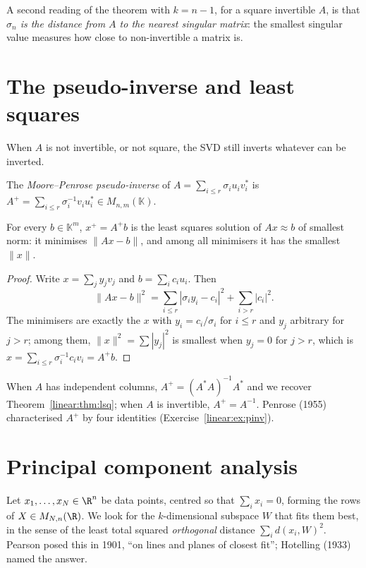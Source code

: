 A second reading of the theorem with $k=n-1$, for a square invertible $A$, is that \emph{$\sigma_n$ is the distance from $A$
to the nearest singular matrix}: the smallest singular value measures how close to non-invertible a matrix is.

\section{The pseudo-inverse and least squares}

When $A$ is not invertible, or not square, the SVD still inverts whatever can be inverted.

\begin{definition}\label{linear:def:pinv}
The \emph{Moore--Penrose pseudo-inverse} of $A=\sum_{i\le r}\sigma_iu_iv_i^*$ is $A^+=\sum_{i\le r}\sigma_i^{-1}v_iu_i^*\in
M_{n,m}(\mathbb K)$.
\end{definition}

\begin{theorem}\label{linear:thm:pinv}
For every $b\in\mathbb K^m$, $x^+=A^+b$ is the least squares solution of $Ax\approx b$ of smallest norm: it minimises $\|Ax-b\|$,
and among all minimisers it has the smallest $\|x\|$.
\end{theorem}
\begin{proof}
Write $x=\sum_jy_jv_j$ and $b=\sum_ic_iu_i$. Then
\[
\|Ax-b\|^2=\sum_{i\le r}|\sigma_iy_i-c_i|^2+\sum_{i>r}|c_i|^2.
\]
The minimisers are exactly the $x$ with $y_i=c_i/\sigma_i$ for $i\le r$ and $y_j$ arbitrary for $j>r$; among them,
$\|x\|^2=\sum|y_j|^2$ is smallest when $y_j=0$ for $j>r$, which is $x=\sum_{i\le r}\sigma_i^{-1}c_iv_i=A^+b$.
\end{proof}

When $A$ has independent columns, $A^+=(A^*A)^{-1}A^*$ and we recover Theorem~\ref{linear:thm:lsq}; when $A$ is invertible,
$A^+=A^{-1}$. Penrose (1955) characterised $A^+$ by four identities (Exercise~\ref{linear:ex:pinv}).

\section{Principal component analysis}

Let $x_1,\dots,x_N\in\R^n$ be data points, centred so that $\sum_ix_i=0$, forming the rows of $X\in M_{N,n}(\R)$. We look for
the $k$-dimensional subspace $W$ that fits them best, in the sense of the least total squared \emph{orthogonal} distance
$\sum_id(x_i,W)^2$. Pearson posed this in 1901, ``on lines and planes of closest fit''; Hotelling (1933) named the answer.

